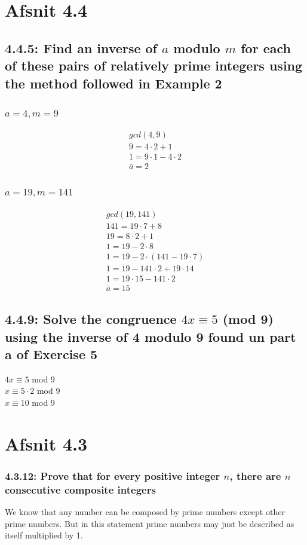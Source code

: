 \documentclass[12pt, a4paper]{report}
\begin{document}
			\section{Afsnit 4.4}
				\setcounter{subsection}{4}
				\subsection{4.4.5: Find an inverse of $a$ modulo $m$ for each of these pairs of relatively prime integers using the method followed in Example 2}
					\subsubsection{$a=4,m=9$}
						\begin{align*}
							gcd(4,9)\\
							9=4\cdot 2 + 1\\
							1=9\cdot 1 - 4\cdot 2\\
							\bar{a}=2
						\end{align*}
					\subsubsection{$a=19,m=141$}
							\begin{align*}
								gcd(19,141)\\
								141=19\cdot 7+8\\
								19 = 8\cdot 2 + 1\\
								1=19-2\cdot 8\\
								1=19-2\cdot(141-19\cdot 7)\\
								1=19-141\cdot 2 +19\cdot 14\\
								1=19\cdot 15-141\cdot 2\\
								\bar{a}=15
							\end{align*}
				\setcounter{subsection}{8}
				\subsection{4.4.9: Solve the congruence $4x\equiv 5$ (mod 9) using the inverse of 4 modulo 9 found un part a of Exercise 5}
					$4x\equiv 5$ mod 9\\
					$x\equiv 5\cdot 2$ mod 9\\
					$x\equiv 10$ mod 9
			\section{Afsnit 4.3}
				\setcounter{subsection}{11}
				\subsubsection{4.3.12: Prove that for every positive integer $n$, there are $n$ consecutive composite integers}
				We know that any number can be composed by prime numbers except other prime numbers. But in this statement prime numbers may just be described as itself multiplied by 1.
				\setcounter{subsection}{4}
\end{document}
